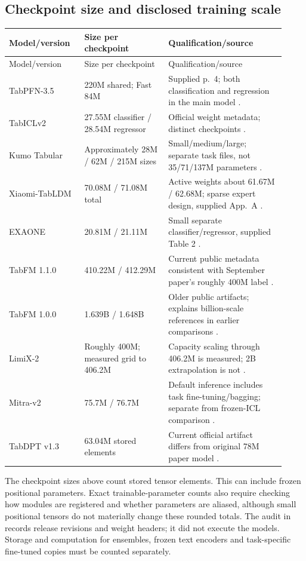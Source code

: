 \documentclass[11pt]{article}
\begin{document}
\subsection{Checkpoint size and disclosed training scale}

\begin{longtable}{@{}p{0.25\linewidth}p{0.28\linewidth}p{0.39\linewidth}@{}}
\toprule Model/version & Size per checkpoint & Qualification/source\\\midrule\endfirsthead
\toprule Model/version & Size per checkpoint & Qualification/source\\\midrule\endhead
TabPFN-3.5 & 220M shared; Fast 84M & Supplied p.\ 4; both classification and regression in the main model \cite{tabpfn35}.\\
TabICLv2 & 27.55M classifier / 28.54M regressor & Official weight metadata; distinct checkpoints \cite{tabicl-weights}.\\
Kumo Tabular & Approximately 28M / 62M / 215M sizes & Small/medium/large; separate task files, not 35/71/137M parameters \cite{kumo-weights}.\\
Xiaomi-TabLDM & 70.08M / 71.08M total & Active weights about 61.67M / 62.68M; sparse expert design, supplied App.\ A \cite{xiaomi}.\\
EXAONE & 20.81M / 21.11M & Small separate classifier/regressor, supplied Table 2 \cite{exaone}.\\
TabFM 1.1.0 & 410.22M / 412.29M & Current public metadata consistent with September paper's roughly 400M label \cite{tabfm11-weights,tabfm}.\\
TabFM 1.0.0 & 1.639B / 1.648B & Older public artifacts; explains billion-scale references in earlier comparisons \cite{tabfm10-weights}.\\
LimiX-2 & Roughly 400M; measured grid to 406.2M & Capacity scaling through 406.2M is measured; 2B extrapolation is not \cite{limix2}.\\
Mitra-v2 & 75.7M / 76.7M & Default inference includes task fine-tuning/bagging; separate from frozen-ICL comparison \cite{mitra2}.\\
TabDPT v1.3 & 63.04M stored elements & Current official artifact differs from original 78M paper model \cite{tabdpt-weights,tabdpt}.\\
\bottomrule
\end{longtable}

The checkpoint sizes above count stored tensor elements. This can include frozen positional parameters. Exact trainable-parameter counts also require checking how modules are registered and whether parameters are aliased, although small positional tensors do not materially change these rounded totals. The audit in  records release revisions and weight headers; it did not execute the models. Storage and computation for ensembles, frozen text encoders and task-specific fine-tuned copies must be counted separately.
\end{document}
